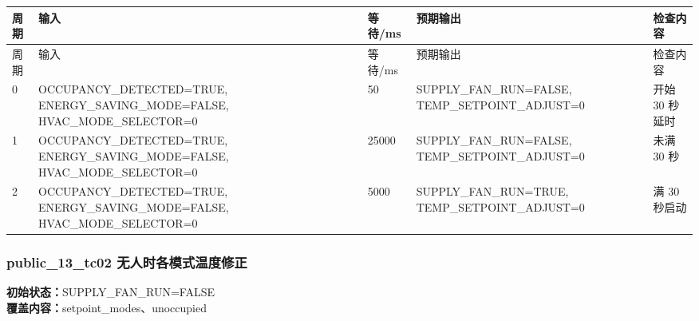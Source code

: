 \begin{longtable}{L{1.0cm}L{4.7cm}L{1.4cm}L{4.0cm}L{2.1cm}}

\toprule

周期 & 输入 & 等待/ms & 预期输出 & 检查内容\\

\midrule

\endfirsthead

\toprule

周期 & 输入 & 等待/ms & 预期输出 & 检查内容\\

\midrule

\endhead

0 & OCCUPANCY\_DETECTED=TRUE, ENERGY\_SAVING\_MODE=FALSE, HVAC\_MODE\_SELECTOR=0 & 50 & SUPPLY\_FAN\_RUN=FALSE, TEMP\_SETPOINT\_ADJUST=0 & 开始 30 秒延时\\

1 & OCCUPANCY\_DETECTED=TRUE, ENERGY\_SAVING\_MODE=FALSE, HVAC\_MODE\_SELECTOR=0 & 25000 & SUPPLY\_FAN\_RUN=FALSE, TEMP\_SETPOINT\_ADJUST=0 & 未满 30 秒\\

2 & OCCUPANCY\_DETECTED=TRUE, ENERGY\_SAVING\_MODE=FALSE, HVAC\_MODE\_SELECTOR=0 & 5000 & SUPPLY\_FAN\_RUN=TRUE, TEMP\_SETPOINT\_ADJUST=0 & 满 30 秒启动\\

\bottomrule

\end{longtable}

\subsubsection{{\ttfamily public\_13\_tc02} 无人时各模式温度修正}

\noindent\textbf{初始状态：}SUPPLY\_FAN\_RUN=FALSE\\

\textbf{覆盖内容：}setpoint\_modes、unoccupied

